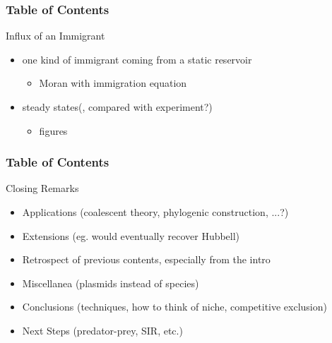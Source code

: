 \documentclass[8pt]{beamer}
\begin{document}
\begin{frame}
\frametitle{Table of Contents}
Influx of an Immigrant
	\begin{itemize}
		\item one kind of immigrant coming from a static reservoir
		\begin{itemize}
			\item Moran with immigration equation
		\end{itemize}
		\item steady states(, compared with experiment?)
		\begin{itemize}
			\item figures
		\end{itemize}
	\end{itemize}
\end{frame}


\begin{frame}
\frametitle{Table of Contents}
Closing Remarks
	\begin{itemize}
		\item Applications (coalescent theory, phylogenic construction, ...?)
		\item Extensions (eg. would eventually recover Hubbell)
		\item Retrospect of previous contents, especially from the intro
		\item Miscellanea (plasmids instead of species)
		\item Conclusions (techniques, how to think of niche, competitive exclusion)
		\item Next Steps (predator-prey, SIR, etc.)
	\end{itemize}
\end{frame}
\end{document}
